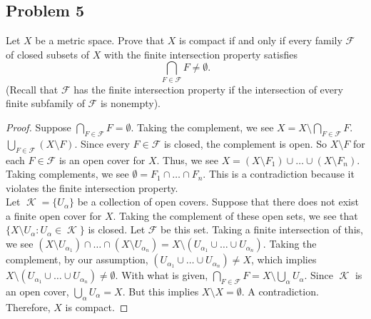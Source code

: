 \documentclass{amsart}
\DeclareMathOperator{\K}{\mathcal{K}}
\begin{document}
\subsection*{Problem 5} Let $X$ be a metric space. Prove that $X$ is compact if and only if every family $\mathcal{F}$ of closed subsets of $X$ with the finite intersection property satisfies 
\[\bigcap_{F \in \mathcal{F}}F \neq \emptyset.\]
(Recall that $\mathcal{F}$ has the finite intersection property if the intersection of every finite subfamily of $\mathcal{F}$ is nonempty). 
\begin{proof}
    Suppose $\bigcap_{F \in \mathcal{F}}F = \emptyset$. Taking the complement, we see $X = X \setminus \bigcap_{F \in \mathcal{F}}F$. \\$ \bigcup_{F \in \mathcal{F}} (X \setminus F).$ Since every $F \in \mathcal{F}$ is closed, the complement is open. So $X \setminus F$ for each $F \in \mathcal{F}$ is an open cover for $X$. Thus, we see $X = (X \setminus F_1) \cup \ldots \cup (X \setminus F_n)$. Taking complements, we see $\emptyset = F_1 \cap \ldots \cap F_n$. This is a contradiction because it violates the finite intersection property. \\ 
    Let $\K = \{U_\alpha\}$ be a collection of open covers. Suppose that there does not exist a finite open cover for $X$. Taking the complement of these open sets, we see that $\{X \setminus U_\alpha : U_\alpha \in \K \}$ is closed. Let $\mathcal{F}$ be this set. Taking a finite intersection of this, we see $(X \setminus U_{\alpha_1})\cap \ldots \cap (X \setminus U_{\alpha_n}) = X \setminus (U_{\alpha_1} \cup \ldots \cup U_{\alpha_n})$. Taking the complement, by our assumption, $(U_{\alpha_1} \cup \ldots \cup U_{\alpha_n}) \neq X$, which implies $X \setminus (U_{\alpha_1} \cup \ldots \cup U_{\alpha_n}) \neq \emptyset$. With what is given, $\bigcap_{F \in \mathcal{F}}F = X \setminus \bigcup_{\alpha}U_\alpha$. Since $\K$ is an open cover, $\bigcup_{\alpha}U_{\alpha} = X$. But this implies $X \setminus X = \emptyset$. A contradiction. Therefore, $X$ is compact.
\end{proof}
\end{document}
